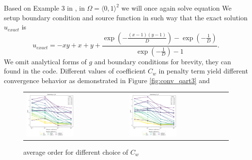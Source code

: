 \begin{example}
\label{ex:quart3}
Based on Example 3 in \cite{Antonietti2013},
in $\Omega = \langle 0, 1 \rangle^2$ we will once again solve equation
We setup boundary condition and source function in such way that the exact 
solution $u_{exact}$ is
\begin{equation}
	u_{exact} = -xy + x +y + \frac{\exp{\left(-\frac{{\left(x - 1\right)} {\left(y - 
	1\right)}}{D}\right)} - 
	\exp{\left(-\frac{1}{D}\right)}}{\exp{\left(-\frac{1}{D}\right)} 
	- 1}.
\end{equation}
We omit analytical forms of $g$ and boundary conditions for brevity, they can found in 
the code. Different values of 
coefficient $C_w$ in penalty term yield different convergence behavior as 
demonstrated in Figure 
\ref{fig:conv_qart3} and 
\end{example}

\begin{figure}[h!]
	\centering
	\begin{tabular}{p{} p{}}
	\vspace{0pt} 
	\includegraphics[width=0.49\textwidth]{../figs/parametric/advdiff_2D/ord_quarteroni2_2_4}
	&
	\vspace{0pt} 
	\includegraphics[width=0.49\textwidth]{../figs/parametric/advdiff_2D/ord_quarteroni2_2_3}
	\end{tabular}
	\caption{ average order for different choice of $C_w$}
	\label{fig:orders_quarteroni3}
\end{figure}


